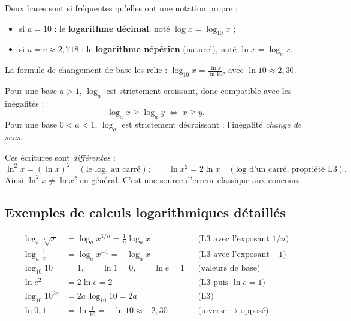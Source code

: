 \documentclass[11pt,a4paper]{article}
\begin{document}
\begin{definition}
Deux bases sont si fréquentes qu'elles ont une notation propre :
\begin{itemize}[leftmargin=1.6em,topsep=2pt,itemsep=1.5pt]
  \item si $a=10$ : le \textbf{logarithme décimal}, noté $\log x = \log_{10} x$ ;
  \item si $a=e\approx 2{,}718$ : le \textbf{logarithme népérien} (naturel), noté $\ln x=\log_{e} x$.
\end{itemize}
La formule de changement de base les relie : $\displaystyle \log_{10} x=\frac{\ln x}{\ln 10}$, avec $\ln 10\approx 2{,}30$.
\end{definition}

\begin{theoreme}
Pour une base $a>1$, $\log_a$ est strictement croissant, donc compatible avec les inégalités :
\[ \log_a x \geq \log_a y \;\Longleftrightarrow\; x\geq y. \]
Pour une base $0<a<1$, $\log_a$ est strictement décroissant : l'inégalité \emph{change de sens}.
\end{theoreme}

\begin{attention}
Ces écritures sont \emph{différentes} :
\[ \ln^{2}x=(\ln x)^{2}\quad(\text{le log, au carré});\qquad
   \ln x^{2}=2\ln x\quad(\text{log d'un carré, propriété L3}). \]
Ainsi $\ln^{2}x \neq \ln x^{2}$ en général. C'est une source d'erreur classique aux concours.
\end{attention}

\subsection{Exemples de calculs logarithmiques détaillés}

\begin{exemple}
\begin{align*}
  \log_a\sqrt[n]{x} &= \log_a x^{1/n} = \tfrac{1}{n}\log_a x &&\text{(L3 avec l'exposant $1/n$)} \\
  \log_a\tfrac{1}{x} &= \log_a x^{-1} = -\log_a x &&\text{(L3 avec l'exposant $-1$)} \\
  \log_{10}10 &= 1, \qquad \ln 1 = 0, \qquad \ln e = 1 &&\text{(valeurs de base)} \\
  \ln e^{2} &= 2\ln e = 2 &&\text{(L3 puis $\ln e=1$)} \\
  \log_{10}10^{2a} &= 2a\,\log_{10}10 = 2a &&\text{(L3)} \\
  \ln 0{,}1 &= \ln\tfrac{1}{10} = -\ln 10 \approx -2{,}30 &&\text{(inverse $\to$ opposé)}
\end{align*}
\end{exemple}
\end{document}

